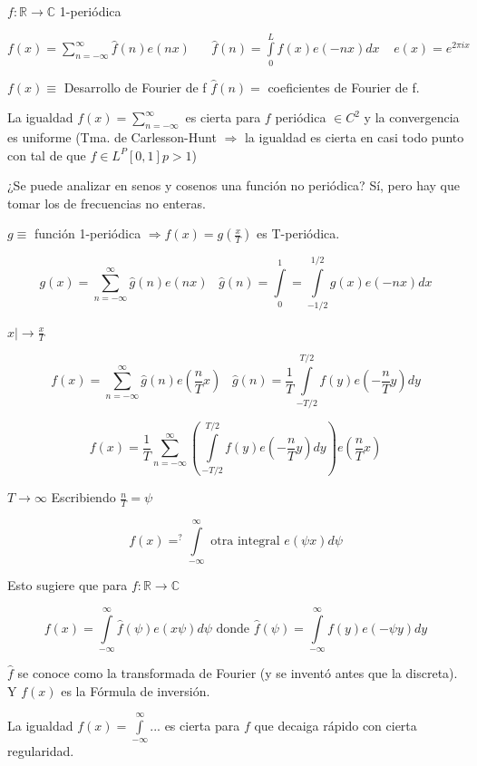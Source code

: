 


$ f: \mathbb{R} \rightarrow \mathbb{C} $ 1-periódica

$f(x) = \sum\limits_{n=-\infty}^{\infty} \hat{f}(n) e(nx) \;\;\;\;\;\; \hat{f}(n) = \int\limits_{0}^{L} f(x) e (-nx) dx \;\;\;\; e(x) = e^{2 \pi i x}$

$f(x) \equiv $ Desarrollo de Fourier de f \;\;\;\; $\hat{f}(n) =$ coeficientes de Fourier de f.

La igualdad $f(x) = \sum^{\infty}_{n=-\infty}$ es cierta para $f$ periódica $\in C^{2}$ y la convergencia es uniforme (Tma. de Carlesson-Hunt $\Rightarrow$ la igualdad es cierta en casi todo punto con tal de que $f \in L^{P} [0,1] p > 1$)

¿Se puede analizar en senos y cosenos una función no periódica? Sí, pero hay que tomar los de frecuencias no enteras.

$g \equiv $ función 1-periódica $ \Rightarrow f(x) = g(\frac{x}{T})$ es T-periódica.

$$ g(x) = \sum^{\infty}_{n=-\infty} \hat{g}(n) e(nx) \;\;\; \hat{g}(n) = \int\limits^{1}_{0} = \int\limits^{1/2}_{-1/2} g(x) e(-nx) dx $$

$x |\rightarrow \frac{x}{T} $

$$f(x) = \sum_{n = -\infty}^{\infty} \hat{g}(n) e(\frac{n}{T}x) \;\;\; \hat{g}(n) = \frac{1}{T} \int\limits^{T/2}_{-T/2} f(y) e(-\frac{n}{T}y) dy$$

$$f(x) = \frac{1}{T} \sum_{n = -\infty}^{\infty} \left(  \int\limits^{T/2}_{-T/2} f(y) e(-\frac{n}{T}y) dy \right) e (\frac{n}{T}x)$$

$T \rightarrow \infty$ Escribiendo $\frac{n}{T} = \psi$

$$ f(x) =^{?} \int\limits^{\infty}_{-\infty} \text{ otra integral } e(\psi x) d\psi $$

Esto sugiere que para $f: \mathbb{R} \rightarrow \mathbb{C}$

$$f(x) = \int\limits^{\infty}_{-\infty} \hat{f}(\psi) e (x \psi) d \psi \text{ donde } \hat{f}(\psi) = \int\limits^{\infty}_{-\infty} f(y) e(-\psi y)dy$$

$\hat{f}$ se conoce como la transformada de Fourier (y se inventó antes que la discreta). Y $f(x)$ es la Fórmula de inversión.

La igualdad $f(x) = \int\limits^{\infty}_{-\infty} $... es cierta para $f$ que decaiga rápido con cierta regularidad.

